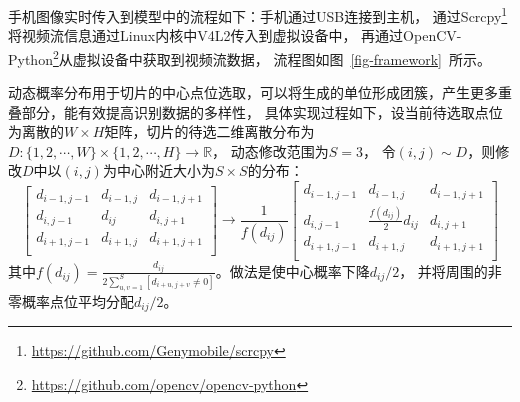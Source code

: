 

\label{app-interaction}
手机图像实时传入到模型中的流程如下：手机通过USB连接到主机，
通过Scrcpy\footnote{\url{https://github.com/Genymobile/scrcpy}\hfill}将视频流信息通过Linux内核中V4L2传入到虚拟设备中，
再通过OpenCV-Python\footnote{\url{https://github.com/opencv/opencv-python}}从虚拟设备中获取到视频流数据，
流程图如图~\ref{fig-framework}~所示。

\label{app-dynamic-distrib}
动态概率分布用于切片的中心点位选取，可以将生成的单位形成团簇，产生更多重叠部分，能有效提高识别数据的多样性，
具体实现过程如下，设当前待选取点位为离散的$W\times H$矩阵，切片的待选二维离散分布为$D:\{1,2,\cdots,W\}\times \{1,2,\cdots,H\}\to \mathbb{R}$，
动态修改范围为$S=3$，
令$(i,j)\sim D$，则修改$D$中以$(i,j)$为中心附近大小为$S\times S$的分布：
\begin{equation}\label{eq-dynamic-distrib}
	\begin{bmatrix}
		d_{i-1,j-1}&d_{i-1,j}&d_{i-1,j+1}\\
		d_{i,j-1}&d_{ij}&d_{i,j+1}\\
		d_{i+1,j-1}&d_{i+1,j}&d_{i+1,j+1}\\
	\end{bmatrix}\to 
	\frac{1}{f(d_{ij})}\begin{bmatrix}
		d_{i-1,j-1}&d_{i-1,j}&d_{i-1,j+1}\\
		d_{i,j-1}&\frac{f(d_{ij})}{2}d_{ij}&d_{i,j+1}\\
		d_{i+1,j-1}&d_{i+1,j}&d_{i+1,j+1}\\
	\end{bmatrix}
\end{equation}
其中$f(d_{ij}) = \frac{d_{ij}}{2\sum_{u,v=1}^{S}[d_{i+u,j+v}\neq 0]}$。做法是使中心概率下降$d_{ij}/2$，
并将周围的非零概率点位平均分配$d_{ij}/2$。


